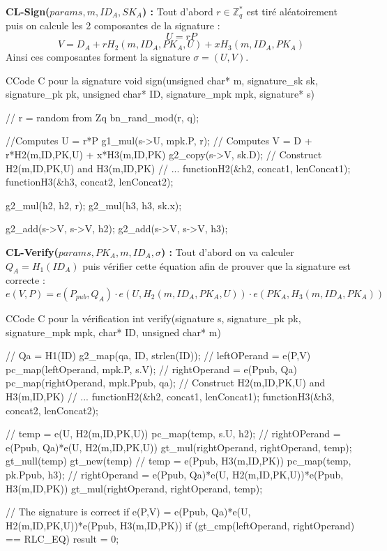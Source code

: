 \textbf{CL-Sign($params, m, ID_A, SK_A$) :} Tout d'abord $r \in \mathbb{Z}_q^*$ est tiré aléatoirement puis on calcule les 2 composantes de la signature :
\[ U = rP\]
\[V = D_A + rH_2(m, ID_A, PK_A,U) + xH_3(m, ID_A, PK_A)\]
Ainsi ces composantes forment la signature $\sigma = (U,V)$.

\begin{sourcebox}{C}{Code C pour la signature}
	void sign(unsigned char* m, signature_sk sk, signature_pk pk, unsigned char* ID, signature_mpk mpk, signature* s){
		// r = random from Zq
		bn_rand_mod(r, q);
		
		//Computes U = r*P
		g1_mul(s->U, mpk.P, r);
		// Computes V = D + r*H2(m,ID,PK,U) + x*H3(m,ID,PK)
		g2_copy(s->V, sk.D);
		// Construct H2(m,ID,PK,U) and H3(m,ID,PK)
		// ...
		functionH2(&h2, concat1, lenConcat1);
		functionH3(&h3, concat2, lenConcat2);
		
		g2_mul(h2, h2, r);
		g2_mul(h3, h3, sk.x);
		
		g2_add(s->V, s->V, h2);
		g2_add(s->V, s->V, h3);
	}
\end{sourcebox}

\textbf{CL-Verify($params, PK_A,  m, ID_A, \sigma$) :} Tout d'abord on va calculer $Q_A = H_1(ID_A)$ puis vérifier cette équation afin de prouver que la signature est correcte :
\[e(V,P) = e(P_{pub}, Q_A) \cdot e(U, H_2(m, ID_A, PK_A,U)) \cdot e(PK_A, H_3(m, ID_A, PK_A)) \]

\begin{sourcebox}{C}{Code C pour la vérification}
	int verify(signature s, signature_pk pk, signature_mpk mpk, char* ID, unsigned char* m){
		// Qa = H1(ID)
		g2_map(qa, ID, strlen(ID));
		// leftOPerand = e(P,V)
		pc_map(leftOperand, mpk.P, s.V);
		// rightOperand = e(Ppub, Qa)
		pc_map(rightOperand, mpk.Ppub, qa);
		// Construct H2(m,ID,PK,U) and H3(m,ID,PK)
		// ...
		functionH2(&h2, concat1, lenConcat1);
		functionH3(&h3, concat2, lenConcat2);
		
		// temp = e(U, H2(m,ID,PK,U))
		pc_map(temp, s.U, h2);
		// rightOPerand = e(Ppub, Qa)*e(U, H2(m,ID,PK,U))
		gt_mul(rightOperand, rightOperand, temp);
		gt_null(temp)
		gt_new(temp)
		// temp = e(Ppub, H3(m,ID,PK))
		pc_map(temp, pk.Ppub, h3);
		// rightOperand = e(Ppub, Qa)*e(U, H2(m,ID,PK,U))*e(Ppub, H3(m,ID,PK))
		gt_mul(rightOperand, rightOperand, temp);
		
		// The signature is correct if e(P,V) = e(Ppub, Qa)*e(U, H2(m,ID,PK,U))*e(Ppub, H3(m,ID,PK))
		if (gt_cmp(leftOperand, rightOperand) == RLC_EQ) {
			result = 0;
		}
	}
\end{sourcebox}

